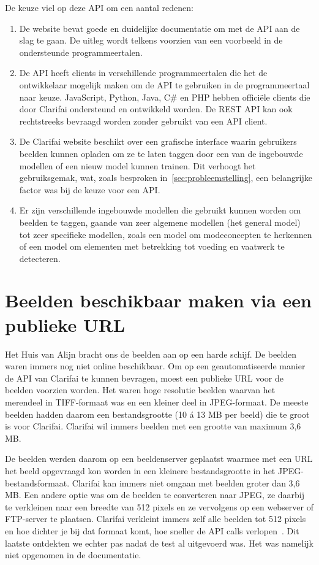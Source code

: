 De keuze viel op deze API om een aantal redenen:
\begin{enumerate}
	\item De website bevat goede en duidelijke documentatie om met de API aan de slag te gaan. De uitleg wordt telkens voorzien van een voorbeeld in de ondersteunde programmeertalen. %
	\item De API heeft clients in verschillende programmeertalen die het de ontwikkelaar mogelijk maken om de API te gebruiken in de programmeertaal naar keuze. JavaScript, Python, Java, C\# en PHP hebben officiële clients die door Clarifai ondersteund en ontwikkeld worden. De REST API kan ook rechtstreeks bevraagd worden zonder gebruikt van een API client.
	\item De Clarifai website beschikt over een grafische interface waarin gebruikers beelden kunnen opladen om ze te laten taggen door een van de ingebouwde modellen of een nieuw model kunnen trainen. Dit verhoogt het gebruiksgemak, wat, zoals besproken in~\ref{sec:probleemstelling}, een belangrijke factor was bij de keuze voor een API.
	\item Er zijn verschillende ingebouwde modellen die gebruikt kunnen worden om beelden te taggen, gaande van zeer algemene modellen (het general model) tot zeer specifieke modellen, zoals een model om modeconcepten te herkennen of een model om elementen met betrekking tot voeding en vaatwerk te detecteren.
\end{enumerate}

\section{Beelden beschikbaar maken via een publieke URL}
\label{sec:beelden-via-URL}

Het Huis van Alijn bracht ons de beelden aan op een harde schijf. De beelden waren immers nog niet online beschikbaar. Om op een geautomatiseerde manier de API van Clarifai te kunnen bevragen, moest een publieke URL voor de beelden voorzien worden. Het waren hoge resolutie beelden waarvan het merendeel in TIFF-formaat was en een kleiner deel in JPEG-formaat. De meeste beelden hadden daarom een bestandsgrootte (10 \'{a} 13 MB per beeld) die te groot is voor Clarifai. Clarifai wil immers beelden met een grootte van maximum 3,6 MB. 

De beelden werden daarom op een beeldenserver geplaatst waarmee met een URL het beeld opgevraagd kon worden in een kleinere bestandsgrootte in het JPEG-bestandsformaat. Clarifai kan immers niet omgaan met beelden groter dan 3,6 MB. Een andere optie was om de beelden te converteren naar JPEG, ze daarbij te verkleinen naar een breedte van 512 pixels en ze vervolgens op een webserver of FTP-server te plaatsen. Clarifai verkleint immers zelf alle beelden tot 512 pixels en hoe dichter je bij dat formaat komt, hoe sneller de API calls verlopen~\autocite{Clairbot2019}. Dit laatste ontdekten we echter pas nadat de test al uitgevoerd was. Het was namelijk niet opgenomen in de documentatie.

